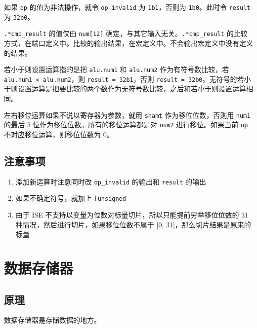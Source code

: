 \documentclass[12pt,AutoFakeBold,AutoFakeSlant]{article}
\providecommand{\tightlist}{%
  \setlength{\itemsep}{0pt}\setlength{\parskip}{0pt}}
\begin{document}
如果 \texttt{op} 的值为非法操作，就令 \texttt{op\_invalid} 为
\texttt{1\textquotesingle{}b1}，否则为
\texttt{1\textquotesingle{}b0}。此时令 \texttt{result} 为
\texttt{32\textquotesingle{}b0}。

\texttt{.*cmp\_result} 的值仅由 \texttt{num{[}12{]}}
确定，与其它输入无关。\texttt{.*cmp\_result}
的比较方式，在端口定义中。比较的输出结果，在宏定义中。不会输出宏定义中没有定义的结果。

若小于则设置运算指的是把 \texttt{alu.num1} 和 \texttt{alu.num2}
作为有符号数比较，若 \texttt{alu.num1\ \textless{}\ alu.num2}，则
\texttt{result\ =\ 32\textquotesingle{}b1}，否则
\texttt{result\ =\ 32\textquotesingle{}b0}。无符号的若小于则设置运算是把要比较的两个数作为无符号数比较，之后和若小于则设置运算相同。

左右移位运算如果不说以寄存器为参数，就用 \texttt{shamt}
作为移位位数，否则用 \texttt{num1} 的最后 5
位作为移位位数。所有的移位运算都是对 \texttt{num2} 进行移位。如果当前
\texttt{op} 不对应移位运算，则移位位数为 0。

\hypertarget{ux6ce8ux610fux4e8bux9879-4}{%
\subsection{注意事项}\label{ux6ce8ux610fux4e8bux9879-4}}

\begin{enumerate}
\def\labelenumi{\arabic{enumi}.}
\tightlist
\item
  添加新运算时注意同时改 \texttt{op\_invalid} 的输出和 \texttt{result}
  的输出
\item
  如果不确定符号，就加上 \texttt{{[}un\textbar{}{]}signed}
\item
  由于 ISE 不支持以变量为位数对标量切片，所以只能提前穷举移位位数的 31
  种情况，然后进行切片，如果移位位数不属于 {[}0,
  31{]}，那么切片结果是原来的标量
\end{enumerate}

\hypertarget{ux6570ux636eux5b58ux50a8ux5668}{%
\section{数据存储器}\label{ux6570ux636eux5b58ux50a8ux5668}}

\hypertarget{ux539fux7406-7}{%
\subsection{原理}\label{ux539fux7406-7}}

数据存储器是存储数据的地方。
\end{document}
